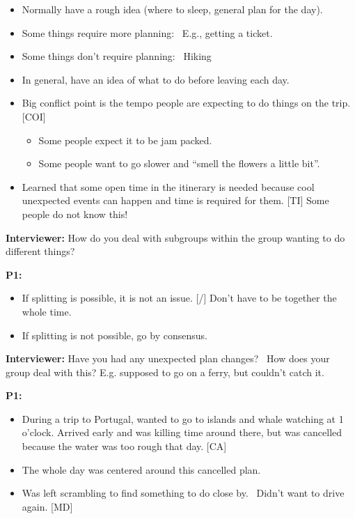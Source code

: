 \documentclass[12pt,a4paper]{article}
\begin{document}
\begin{itemize}
    \item Normally have a rough idea (where to sleep, general plan for the day).
    \item Some things require more planning: 
E.g., getting a ticket. 

    \item Some things don’t require planning: 
Hiking

    \item In general, have an idea of what to do before leaving each day. 
    \item Big conflict point is the tempo people are expecting to do things on the trip. [COI]
    \begin{itemize}
        \item Some people expect it to be jam packed. 
        \item Some people want to go slower and “smell the flowers a little bit”. 
    \end{itemize}
    \item Learned that some open time in the itinerary is needed because cool unexpected events can happen and time is required for them. [TI]
Some people do not know this!

\end{itemize}

\textbf{Interviewer:} How do you deal with subgroups within the group wanting to do different things?

\textbf{P1:}

\begin{itemize}
    \item If splitting is possible, it is not an issue. [/]
Don’t have to be together the whole time. 

    \item If splitting is not possible, go by consensus. 
\end{itemize}

\textbf{Interviewer:} Have you had any unexpected plan changes?  How does your group deal with this? E.g. supposed to go on a ferry, but couldn't catch it.

\textbf{P1:}

\begin{itemize}
    \item During a trip to Portugal, wanted to go to islands and whale watching at 1 o’clock. Arrived early and was killing time around there, but was cancelled because the water was too rough that day. [CA]
    \item The whole day was centered around this cancelled plan.
    \item Was left scrambling to find something to do close by. 
Didn’t want to drive again. [MD]

\end{itemize}
\end{document}
